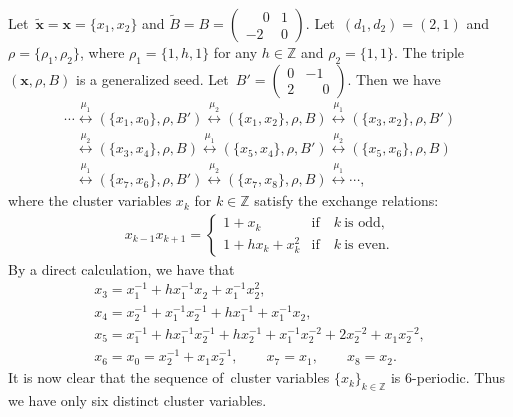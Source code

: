 \documentclass[10pt,a4paper]{amsart}
\numberwithin{equation}{section}
\begin{document}
\begin{Example}
Let~$\mathbf{\widetilde{x}}=\mathbf{x}=\{x_1,x_2\}$ and
$\widetilde{B}=B=
 \left(\begin{smallmatrix} \phantom{-}0 & 1 \\ -2 & 0 \end{smallmatrix}\right)$.
Let~$(d_1,d_2)=(2,1)$ and $\rho=\{\rho_1,\rho_2\}$, where $\rho_1=\{1,h,1\}$ for any $h\in\mathbb{Z}$ and $\rho_2=\{1,1\}$.
The triple $(\mathbf{x},\rho,B)$ is a generalized seed. Let~$B'=
 \left(\begin{smallmatrix} 0 & -1 \\ 2 & \phantom{-}0 \end{smallmatrix}\right)$.
Then we have
\begin{gather*}
 \cdots\stackrel{\mu_1}\longleftrightarrow(\{x_1,x_0\},\rho,B')
\stackrel{\mu_2}\longleftrightarrow (\{x_1,x_2\},\rho,B)
\stackrel{\mu_1}\longleftrightarrow(\{x_3,x_2\},\rho,B')
\\ \phantom{\cdots}
 {}\stackrel{\mu_2}\longleftrightarrow (\{x_3,x_4\},\rho,B)
\stackrel{\mu_1}\longleftrightarrow(\{x_5,x_4\},\rho,B')
\stackrel{\mu_2}\longleftrightarrow (\{x_5,x_6\},\rho,B)
\\ \phantom{\cdots}
 {} \stackrel{\mu_1}\longleftrightarrow(\{x_7,x_6\},\rho,B')
\stackrel{\mu_2}\longleftrightarrow (\{x_7,x_8\},\rho,B)\stackrel{\mu_1}\longleftrightarrow\cdots,
\end{gather*}
where the cluster variables $x_k$ for $k\in \mathbb{Z}$ satisfy the exchange relations:
\begin{gather*}
 x_{k-1}x_{k+1}=
 \begin{cases}
 1+x_k &\text{if}\quad k \ \text{is odd},
 \\
 1+hx_k+x_{k}^{2}&\text{if}\quad k\ \text{is even}.
 \end{cases}
\end{gather*}
By a direct calculation, we have that
\begin{gather*}
 x_3=x^{-1}_1+hx^{-1}_1x^{}_2+x^{-1}_1x^{2}_2,\\
 x_4= x^{-1}_2+x^{-1}_1x^{-1}_2+hx^{-1}_1+x^{-1}_1x^{}_2,\\
 x_5=x^{-1}_1+hx^{-1}_1x^{-1}_2+hx^{-1}_2+x^{-1}_1x^{-2}_2+2x^{-2}_2+x^{}_1x^{-2}_2,\\
 x_6=x_0=x^{-1}_2+x^{}_1x^{-1}_2, \qquad
 x_7=x_1, \qquad x_8=x_2.
\end{gather*}
It is now clear that the sequence of~cluster variables $\{x_k\}_{k\in\mathbb{Z}}$ is $6$-periodic. Thus we have only six distinct cluster variables.
\end{Example}
\end{document}
